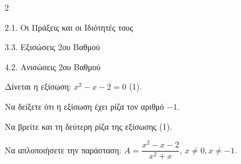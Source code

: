 \begin{ylh}{2}
    \item 2.1. Οι Πράξεις και οι Ιδιότητές τους
    \item 3.3. Εξισώσεις 2ου Βαθμού
    \item 4.2. Ανισώσεις 2ου Βαθμού
\end{ylh}
Δίνεται η εξίσωση: $x^2 - x - 2 = 0$ (1).
\begin{alist}
\item Να δείξετε ότι η εξίσωση έχει ρίζα τον αριθμό $-1$. 
\item Να βρείτε και τη δεύτερη ρίζα της εξίσωσης (1). 
\item Να απλοποιήσετε την παράσταση: $A = \dfrac{x^2-x-2}{x^2+x}$, $x \neq 0, x \neq -1$. 

\end{alist}

